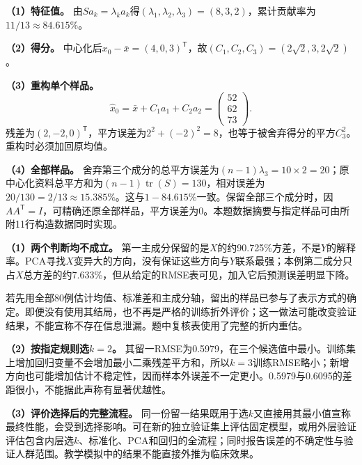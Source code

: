 \textbf{（1）特征值。} 由$Sa_k=\lambda_k a_k$得$(\lambda_1,\lambda_2,\lambda_3)=(8,3,2)$，累计贡献率为$11/13\approx84.615\%$。\par\textbf{（2）得分。} 中心化后$x_0-\bar x=(4,0,3)^{\mathsf T}$，故$(C_1,C_2,C_3)=(2\sqrt2,3,2\sqrt2)$。\par\textbf{（3）重构单个样品。}\[\widehat x_0=\bar x+C_1a_1+C_2a_2=\begin{pmatrix}52\\62\\73\end{pmatrix}.\]残差为$(2,-2,0)^{\mathsf T}$，平方误差为$2^2+(-2)^2=8$，也等于被舍弃得分的平方$C_3^2$。重构时必须加回原均值。\par\textbf{（4）全部样品。} 舍弃第三个成分的总平方误差为$(n-1)\lambda_3=10\times2=20$；原中心化资料总平方和为$(n-1)\operatorname{tr}(S)=130$，相对误差为$20/130=2/13\approx15.385\%$。这与$1-84.615\%$一致。保留全部三个成分时，因$AA^{\mathsf T}=I$，可精确还原全部样品，平方误差为0。本题数据摘要与指定样品可由所附11行构造数据同时实现。
\par\nobreak\smallskip{}

\textbf{（1）两个判断均不成立。} 第一主成分保留的是$X$的约90.725\%方差，不是$Y$的解释率。PCA寻找$X$变异大的方向，没有保证这些方向与$Y$联系最强；本例第二成分只占$X$总方差的约7.633\%，但从给定的RMSE表可见，加入它后预测误差明显下降。\par 若先用全部80例估计均值、标准差和主成分轴，留出的样品已参与了表示方式的确定。即便没有使用其结局，也不再是严格的训练折外评价；这一做法可能改变验证结果，不能宣称不存在信息泄漏。题中复核表使用了完整的折内重估。\par\textbf{（2）按指定规则选$k=2$。} 其留一RMSE为0.5979，在三个候选值中最小。训练集上增加回归变量不会增加最小二乘残差平方和，所以$k=3$训练RMSE略小；新增方向也可能增加估计不稳定性，因而样本外误差不一定更小。0.5979与0.6095的差距很小，不能据此声称有显著优越性。\par\textbf{（3）评价选择后的完整流程。} 同一份留一结果既用于选$k$又直接用其最小值宣称最终性能，会受到选择影响。可在新的独立验证集上评估固定模型，或用外层验证评估包含内层选$k$、标准化、PCA和回归的全流程；同时报告误差的不确定性与验证人群范围。教学模拟中的结果不能直接外推为临床效果。
\par\nobreak\smallskip{}
